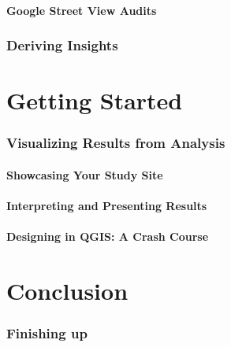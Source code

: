 \documentclass[
]{latex/krantz}
\begin{document}
\hypertarget{google-street-view-audits}{%
\subsection{Google Street View Audits}\label{google-street-view-audits}}

\hypertarget{deriving-insights}{%
\section{Deriving Insights}\label{deriving-insights}}

\hypertarget{part-getting-started-1}{%
\part{Getting Started}\label{part-getting-started-1}}

\hypertarget{visualizing-results-from-analysis}{%
\section{Visualizing Results from Analysis}\label{visualizing-results-from-analysis}}

\hypertarget{showcasing-your-study-site}{%
\subsection{Showcasing Your Study Site}\label{showcasing-your-study-site}}

\hypertarget{interpreting-and-presenting-results}{%
\subsection{Interpreting and Presenting Results}\label{interpreting-and-presenting-results}}

\hypertarget{designing-in-qgis-a-crash-course}{%
\subsection{Designing in QGIS: A Crash Course}\label{designing-in-qgis-a-crash-course}}

\hypertarget{part-conclusion}{%
\part{Conclusion}\label{part-conclusion}}

\hypertarget{finishing-up}{%
\section{Finishing up}\label{finishing-up}}
\end{document}

